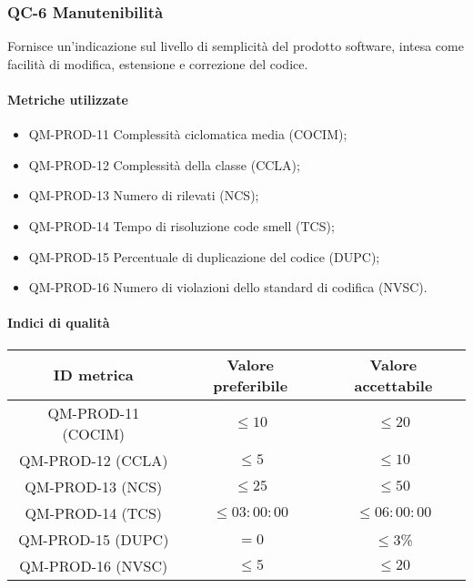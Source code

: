 \subsubsection{QC-6 Manutenibilità}
Fornisce un'indicazione sul livello di semplicità del prodotto software, intesa come facilità di modifica, estensione e correzione del codice.

	\paragraph{Metriche utilizzate}
	\begin{itemize}
		\item QM-PROD-11 Complessità ciclomatica media (COCIM);
		\item QM-PROD-12 Complessità della classe (CCLA);
		\item QM-PROD-13 Numero di  rilevati (NCS);
		\item QM-PROD-14 Tempo di risoluzione code smell (TCS);
		\item QM-PROD-15 Percentuale di duplicazione del codice (DUPC);
		\item QM-PROD-16 Numero di violazioni dello standard di codifica (NVSC).
	\end{itemize}

	\paragraph{Indici di qualità}
	\begin{center}
		\begin{tabular}{|c|c|c|}
			\rowcolor{lighter-grayer}
			\hline
			\textbf{ID metrica} & \textbf{Valore preferibile} & \textbf{Valore accettabile} \\
			\hline
			QM-PROD-11 (COCIM) & \(\le 10\) & \(\le 20\) \\
			\hline
			QM-PROD-12 (CCLA) & \(\le 5\) & \(\le 10\) \\
			\hline
			QM-PROD-13 (NCS) & \(\le 25\) & \(\le 50\) \\
			\hline
			QM-PROD-14 (TCS) & \(\le 03:00:00\) & \(\le 06:00:00\) \\
			\hline
			QM-PROD-15 (DUPC) & \(= 0\) & \(\le 3\)\% \\
			\hline
			QM-PROD-16 (NVSC) & \(\le 5\) & \(\le 20\) \\
			\hline
		\end{tabular}
	\end{center}
